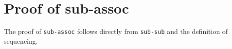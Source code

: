 \begin{fence}
\begin{code}
\AgdaSpace{}%
\AgdaSpace{}%
\AgdaSymbol{(}\AgdaSpace{}%
\AgdaSpace{}%
\AgdaSpace{}%
\AgdaSpace{}%
\AgdaSymbol{)}\<%
\\
%
\>[3]\AgdaSpace{}%
\AgdaSymbol{\{}\AgdaSpace{}%
\AgdaSymbol{=}\AgdaSpace{}%
\AgdaSymbol{\}}\AgdaSpace{}%
\<%
\\
\>[3][@{}l@{\AgdaIndent{0}}]%
\>[5]\AgdaSpace{}%
\AgdaSpace{}%
\AgdaSpace{}%
\AgdaSpace{}%
\AgdaSpace{}%
\AgdaSpace{}%
\<%
\\
%
\>[3]\<%
\\
\>[3][@{}l@{\AgdaIndent{0}}]%
\>[5]\AgdaSpace{}%
\AgdaSpace{}%
\AgdaSpace{}%
\AgdaSpace{}%
\AgdaSpace{}%
\<%
\\
%
\>[3]\<%
\end{code}
\end{fence}

\hypertarget{proof-of-sub-assoc}{%
\section{Proof of sub-assoc}\label{proof-of-sub-assoc}}

The proof of \texttt{sub-assoc} follows directly from \texttt{sub-sub}
and the definition of sequencing.

